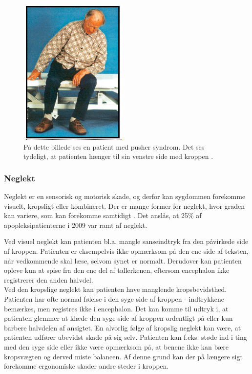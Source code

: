 \begin{figure}[H]
	\centering
	\includegraphics[scale=0.9]{figures/bProblemanalyse/Pusher.png}
	\caption{På dette billede ses en patient med pusher syndrom. Det ses tydeligt, at patienten hænger til sin venstre side med kroppen \cite{Karnath2003}.}
	\label{pusher}
\end{figure}

\subsubsection{Neglekt}
Neglekt er en sensorisk og motorisk skade, og derfor kan sygdommen forekomme visuelt, kropsligt eller kombineret.  Der er mange former for neglekt, hvor graden kan variere, som kan forekomme samtidigt \cite{Sundhed.dk2014}. Det anslås, at 25\% af apopleksipatienterne i 2009 var ramt af neglekt. \cite{Sundhedsstyrelsen2009}

Ved visuel neglekt kan patienten bl.a. mangle sanseindtryk fra den påvirkede side af kroppen. Patienten er eksempelvis ikke opmærksom på den ene side af teksten, når vedkommende skal læse, selvom synet er normalt. Derudover kan patienten opleve kun at spise fra den ene del af tallerkenen, eftersom encephalon ikke registrerer den anden halvdel. \cite{Sundhed.dk2014}\\
Ved den kropslige neglekt kan patienten have manglende kropsbevidsthed. Patienten har ofte normal følelse i den syge side af kroppen - indtrykkene bemærkes, men registres ikke i encephalon. Det kan komme til udtryk i, at patienten glemmer at klæde den syge side af kroppen ordentligt på eller kun barbere halvdelen af ansigtet. En alvorlig følge af kropslig neglekt kan være, at patienten udfører ubevidst skade på sig selv. Patienten kan f.eks. støde ind i ting med den syge side eller ikke være opmærksom på, at benene ikke kan bære kropsvægten og derved miste balancen. Af denne grund kan der på længere sigt forekomme ergonomiske skader andre steder i kroppen. \cite{Kruuse2015a}

